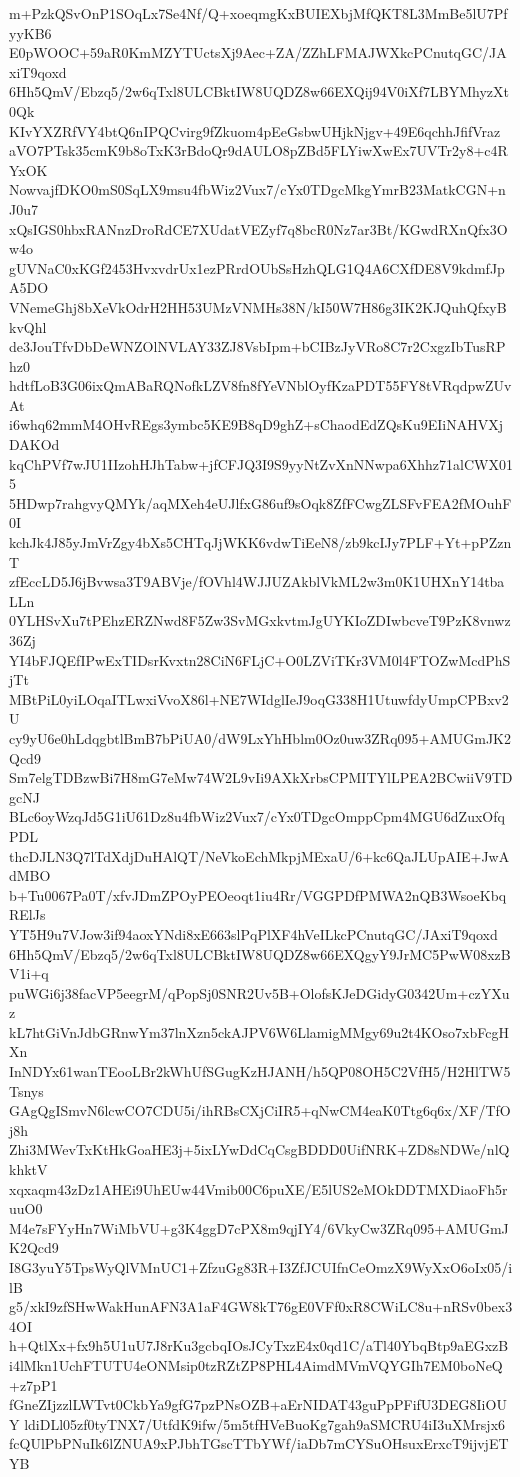 m+PzkQSvOnP1SOqLx7Se4Nf/Q+xoeqmgKxBUIEXbjMfQKT8L3MmBe5lU7PfyyKB6
E0pWOOC+59aR0KmMZYTUctsXj9Aec+ZA/ZZhLFMAJWXkcPCnutqGC/JAxiT9qoxd
6Hh5QmV/Ebzq5/2w6qTxl8ULCBktIW8UQDZ8w66EXQij94V0iXf7LBYMhyzXt0Qk
KIvYXZRfVY4btQ6nIPQCvirg9fZkuom4pEeGsbwUHjkNjgv+49E6qchhJfifVraz
aVO7PTsk35cmK9b8oTxK3rBdoQr9dAULO8pZBd5FLYiwXwEx7UVTr2y8+c4RYxOK
NowvajfDKO0mS0SqLX9msu4fbWiz2Vux7/cYx0TDgcMkgYmrB23MatkCGN+nJ0u7
xQsIGS0hbxRANnzDroRdCE7XUdatVEZyf7q8bcR0Nz7ar3Bt/KGwdRXnQfx3Ow4o
gUVNaC0xKGf2453HvxvdrUx1ezPRrdOUbSsHzhQLG1Q4A6CXfDE8V9kdmfJpA5DO
VNemeGhj8bXeVkOdrH2HH53UMzVNMHs38N/kI50W7H86g3IK2KJQuhQfxyBkvQhl
de3JouTfvDbDeWNZOlNVLAY33ZJ8VsbIpm+bCIBzJyVRo8C7r2CxgzIbTusRPhz0
hdtfLoB3G06ixQmABaRQNofkLZV8fn8fYeVNblOyfKzaPDT55FY8tVRqdpwZUvAt
i6whq62mmM4OHvREgs3ymbc5KE9B8qD9ghZ+sChaodEdZQsKu9EIiNAHVXjDAKOd
kqChPVf7wJU1IIzohHJhTabw+jfCFJQ3I9S9yyNtZvXnNNwpa6Xhhz71alCWX015
5HDwp7rahgvyQMYk/aqMXeh4eUJlfxG86uf9sOqk8ZfFCwgZLSFvFEA2fMOuhF0I
kchJk4J85yJmVrZgy4bXs5CHTqJjWKK6vdwTiEeN8/zb9kcIJy7PLF+Yt+pPZznT
zfEccLD5J6jBvwsa3T9ABVje/fOVhl4WJJUZAkblVkML2w3m0K1UHXnY14tbaLLn
0YLHSvXu7tPEhzERZNwd8F5Zw3SvMGxkvtmJgUYKIoZDIwbcveT9PzK8vnwz36Zj
YI4bFJQEfIPwExTIDsrKvxtn28CiN6FLjC+O0LZViTKr3VM0l4FTOZwMcdPhSjTt
MBtPiL0yiLOqaITLwxiVvoX86l+NE7WIdglIeJ9oqG338H1UtuwfdyUmpCPBxv2U
cy9yU6e0hLdqgbtlBmB7bPiUA0/dW9LxYhHblm0Oz0uw3ZRq095+AMUGmJK2Qcd9
Sm7elgTDBzwBi7H8mG7eMw74W2L9vIi9AXkXrbsCPMITYlLPEA2BCwiiV9TDgcNJ
BLc6oyWzqJd5G1iU61Dz8u4fbWiz2Vux7/cYx0TDgcOmppCpm4MGU6dZuxOfqPDL
thcDJLN3Q7lTdXdjDuHAlQT/NeVkoEchMkpjMExaU/6+kc6QaJLUpAIE+JwAdMBO
b+Tu0067Pa0T/xfvJDmZPOyPEOeoqt1iu4Rr/VGGPDfPMWA2nQB3WsoeKbqRElJs
YT5H9u7VJow3if94aoxYNdi8xE663slPqPlXF4hVeILkcPCnutqGC/JAxiT9qoxd
6Hh5QmV/Ebzq5/2w6qTxl8ULCBktIW8UQDZ8w66EXQgyY9JrMC5PwW08xzBV1i+q
puWGi6j38facVP5eegrM/qPopSj0SNR2Uv5B+OlofsKJeDGidyG0342Um+czYXuz
kL7htGiVnJdbGRnwYm37lnXzn5ckAJPV6W6LlamigMMgy69u2t4KOso7xbFcgHXn
InNDYx61wanTEooLBr2kWhUfSGugKzHJANH/h5QP08OH5C2VfH5/H2HlTW5Tsnys
GAgQgISmvN6lcwCO7CDU5i/ihRBsCXjCiIR5+qNwCM4eaK0Ttg6q6x/XF/TfOj8h
Zhi3MWevTxKtHkGoaHE3j+5ixLYwDdCqCsgBDDD0UifNRK+ZD8sNDWe/nlQkhktV
xqxaqm43zDz1AHEi9UhEUw44Vmib00C6puXE/E5lUS2eMOkDDTMXDiaoFh5ruuO0
M4e7sFYyHn7WiMbVU+g3K4ggD7cPX8m9qjIY4/6VkyCw3ZRq095+AMUGmJK2Qcd9
I8G3yuY5TpsWyQlVMnUC1+ZfzuGg83R+I3ZfJCUIfnCeOmzX9WyXxO6oIx05/ilB
g5/xkI9zfSHwWakHunAFN3A1aF4GW8kT76gE0VFf0xR8CWiLC8u+nRSv0bex34OI
h+QtlXx+fx9h5U1uU7J8rKu3gcbqIOsJCyTxzE4x0qd1C/aTl40YbqBtp9aEGxzB
i4lMkn1UchFTUTU4eONMsip0tzRZtZP8PHL4AimdMVmVQYGIh7EM0boNeQ+z7pP1
fGneZIjzzlLWTvt0CkbYa9gfG7pzPNsOZB+aErNIDAT43guPpPFifU3DEG8IiOUY
ldiDLl05zf0tyTNX7/UtfdK9ifw/5m5tfHVeBuoKg7gah9aSMCRU4iI3uXMrsjx6
fcQUlPbPNuIk6lZNUA9xPJbhTGscTTbYWf/iaDb7mCYSuOHsuxErxcT9ijvjETYB
